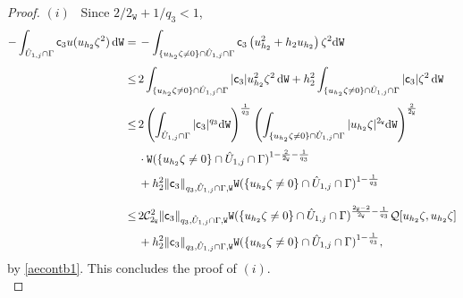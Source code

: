 \documentclass[reqno, 11pt, a4paper]{amsart}
\numberwithin{equation}{section}
\newcommand{\ops}{\mathcal{Q}}
\newcommand{\xw}{2_{\mathtt{W}}}
\newcommand{\fc}{\mathsf c}
\newcommand{\wghtw}{\mathtt{W}}
\newcommand{\dww}{\textnormal{d} \mathtt{W}}
\begin{document}
\begin{proof}
\noindent $(i)$ \, Since $2/\xw + 1/q_3 <1$,
\begin{align*}
-\int _{\hat U _{1,j} \cap \Gamma }  \fc _3  u (u_{h_{2}}  \zeta ^2 )  \,  \dww   = & \displaystyle \,  -\int _{\{ u_{h_{2}}  \zeta  \neq 0\} \cap \hat U _{1,j} \cap \Gamma }  \fc _3 \left(  u_{h_{2}}  ^2 + h_{2}  u_{h_{2}}  \right) \zeta ^2   \dww   \\[3pt]
 \leq & \displaystyle \, 2 \int _{\{ u_{h_{2}}  \zeta  \neq 0 \} \cap \hat U _{1,j} \cap \Gamma }  |\fc _3|  u_{h_{2}}  ^2 \zeta ^2  \, \dww   + h_{2}^2    \int _{\{ u_{h_{2}}  \zeta  \neq 0 \} \cap \hat U _{1,j} \cap \Gamma }     |\fc _3|\zeta ^2  \, \dww   \\[3pt]
 \leq & \displaystyle \,  2\left( \int _{\hat U _{1,j} \cap \Gamma }  |\fc _3| ^{q_3}  \dww  \right) ^{\frac{1}{q_3}} \left( \int _{\{ u_{h_{2}}  \zeta \neq 0 \} \cap \hat U _{1,j} \cap \Gamma }   | u_{h_{2}}  \zeta |^ {\xw }  \dww    \right) ^{\frac{2}{\xw}}  \\[3pt]
& \displaystyle \, \cdot \wghtw  ( \{ u_{h_{2}}  \zeta \neq 0 \} \cap \hat U _{1,j} \cap \Gamma  ) ^ {1-\frac{2}{\xw} - \frac{1}{q_3}} \\[3pt]
& \displaystyle \,  + h_{2}^2 \Vert \fc _3 \Vert _{q_3 , \hat U _{1,j} \cap \Gamma , \wghtw}  \wghtw  (  \{ u_{h_{2}}  \zeta \neq 0 \} \cap \hat U _{1,j} \cap \Gamma )^{1-\frac{1}{q_3}}\\[7pt]
 \leq   & \displaystyle \, 2 \mathcal C ^2 _{\xw} \Vert \fc _3 \Vert _{ q_3 , \hat U _{1,j} \cap \Gamma , \wghtw}  \wghtw  (  \{ u_{h_{2}}  \zeta \neq 0 \} \cap \hat U _{1,j} \cap \Gamma ) ^ {\frac{\xw -2}{\xw} - \frac{1}{q_3}} \ops [ u_{h_{2}}  \zeta , u_{h_{2}}  \zeta] \\[3pt]
& \displaystyle \,  + h_{2}^2 \Vert \fc _3 \Vert _{q_3 , \hat U _{1,j} \cap \Gamma , \wghtw  } \wghtw  (  \{ u_{h_{2}}  \zeta \neq 0 \} \cap \hat U _{1,j} \cap \Gamma )^{1-\frac{1}{q_3}}, 
\end{align*}
by \eqref{aecontb1}. This concludes the proof of $(i)$.\\


\end{proof}
\end{document}
